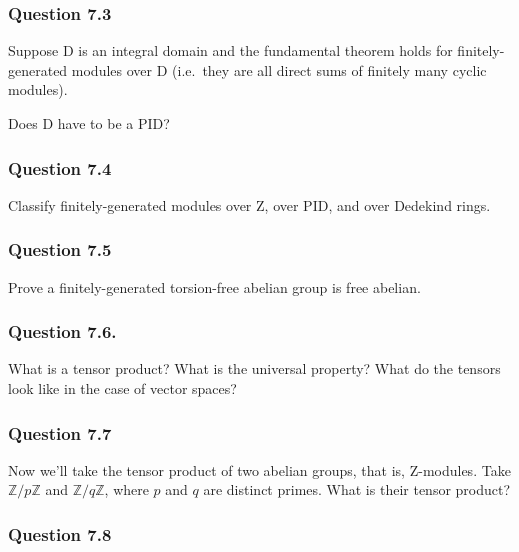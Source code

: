 \hypertarget{question-7.3}{%
\subsubsection{Question 7.3}\label{question-7.3}}

Suppose D is an integral domain and the fundamental theorem holds for
finitely-generated modules over D (i.e.~they are all direct sums of
finitely many cyclic modules).

Does D have to be a PID?

\hypertarget{question-7.4}{%
\subsubsection{Question 7.4}\label{question-7.4}}

Classify finitely-generated modules over Z, over PID, and over Dedekind
rings.

\hypertarget{question-7.5}{%
\subsubsection{Question 7.5}\label{question-7.5}}

Prove a finitely-generated torsion-free abelian group is free abelian.

\hypertarget{question-7.6.}{%
\subsubsection{Question 7.6.}\label{question-7.6.}}

What is a tensor product? What is the universal property? What do the
tensors look like in the case of vector spaces?

\hypertarget{question-7.7}{%
\subsubsection{Question 7.7}\label{question-7.7}}

Now we'll take the tensor product of two abelian groups, that is,
Z-modules. Take \({\mathbb{Z}}/p{\mathbb{Z}}\) and
\({\mathbb{Z}}/q{\mathbb{Z}}\), where \(p\) and \(q\) are distinct
primes. What is their tensor product?

\hypertarget{question-7.8}{%
\subsubsection{Question 7.8}\label{question-7.8}}

